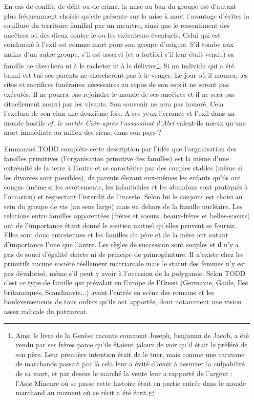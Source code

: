 En cas de conflit, de délit ou de crime, la mise au ban du groupe est d'autant plus fréquemment choisie qu'elle présente sur la mise à mort l'avantage d'éviter la souillure du territoire familial par un meurtre, ainsi que le ressentiment des ancêtres ou des dieux contre le ou les exécuteurs éventuels. Celui qui est condamné à l'exil est comme mort pour son groupe d'origine. S'il tombe aux mains d'un autre groupe, s'il est asservi (et a fortiori s'il leur était vendu) sa famille ne cherchera ni à le racheter ni à le délivrer\footnote{Ainsi le livre de la Genèse raconte comment Joseph, benjamin de Jacob, a été vendu par ses frères parce qu'ils étaient jaloux de voir qu'il était le préféré de son père. Leur première intention était de le tuer, mais comme une caravane de marchands passait par là cela leur a évité d'avoir à assumer la culpabilité de sa mort, et par dessus le marché la vente leur a rapporté de l'argent : l'Asie Mineure où se passe cette histoire était en partie entrée dans le monde marchand au moment où ce récit a été écrit.}. Si un individu qui a été banni est tué ses parents ne chercheront pas à le venger. Le jour où il mourra, les rites et sacrifices funéraires nécessaires au repos de son esprit ne seront pas exécutés. Il ne pourra pas rejoindre le monde de ses ancêtres et il ne sera pas rituellement nourri par les vivants. Son souvenir ne sera pas honoré. Cela l'exclura de son clan une deuxième fois. A ses yeux l'errance et l'exil dans un monde hostile \emph{cf. le sortde Cain après l'assassinat d'Abel} valent-ils mieux qu'une mort immédiate au milieu des siens, dans son pays ?

 Emmanuel TODD complète cette description par l'idée que l'organisation des familles primitives (l'organisation primitive des familles) est la même d'une extrémité de la terre à l'autre et se caractérise par des couples stables (même si les divorces sont possibles), de parents élevant eux-mêmes les enfants qu'ils ont conçus (même si les avortements, les infanticides et les abandons sont pratiqués à l'occasion) et respectant l'interdit de l'inceste. Selon lui le conjoint est choisi au sein du groupe de vie (au sens large) mais en dehors de la famille nucléaire. Les relations entre familles apparentées (frères et soeurs, beaux-frères et belles-soeurs) ont de l'importance étant donné le soutien mutuel qu'elles peuvent se fournir. Elles sont donc entretenues et les familles du père et de la mère ont autant d'importance l'une que l'autre. Les règles de succession sont souples et il n'y a pas de souci d'égalité stricte ni de principe de primogéniture. Il n'existe chez les primitifs aucune société réellement matriarcale mais le statut des femmes n'y est pas dévalorisé, même s'il peut y avoir à l'occasion de la polygamie. Selon TODD c'est ce type de famille qui prévalait en Europe de l'Ouest (Germanie, Gaule, Iles britanniques, Scandinavie...) avant l'entrée en scène des romains et les bouleversements de tous ordres qu'ils ont apportés, dont notamment une vision assez radicale du patriarcat. 



